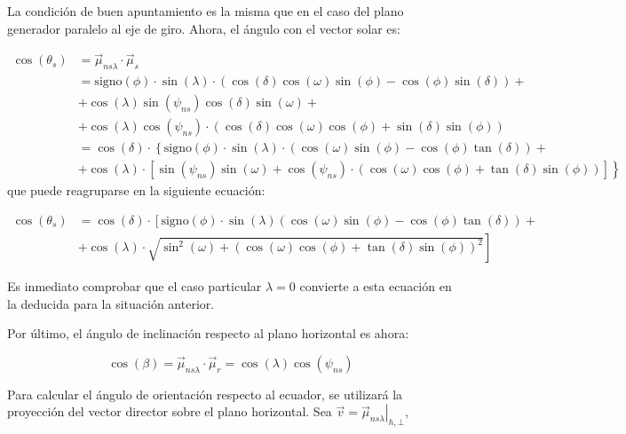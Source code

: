 La condición de buen apuntamiento es la misma que en el caso del plano
generador paralelo al eje de giro. Ahora, el ángulo con el vector
solar es:

\begin{align}
\cos(\theta_{s}) & =\vec{\mu}_{ns\lambda}\cdot\vec{\mu}_{s}\nonumber \\
 & =\mathrm{signo}(\phi)\cdot\sin(\lambda)\cdot\left(\cos(\delta)\cos(\omega)\sin(\phi)-\cos(\phi)\sin(\delta)\right)+\nonumber \\
 & +\cos(\lambda)\sin(\psi_{ns})\cos(\delta)\sin(\omega)+\nonumber \\
 & +\cos(\lambda)\cos(\psi_{ns})\cdot\left(\cos(\delta)\cos(\omega)\cos(\phi)+\sin(\delta)\sin(\phi)\right)\label{eq:cosThetaNSInclinado1}\\
 & =\cos(\delta)\cdot\left\{ \mathrm{signo}(\phi)\cdot\sin(\lambda)\cdot\left(\cos(\omega)\sin(\phi)-\cos(\phi)\tan(\delta)\right)\right.+\nonumber \\
 & +\cos(\lambda)\cdot\left.\left[\sin(\psi_{ns})\sin(\omega)+\cos(\psi_{ns})\cdot\left(\cos(\omega)\cos(\phi)+\tan(\delta)\sin(\phi)\right)\right]\right\} \nonumber \end{align}
que puede reagruparse en la siguiente ecuación:

\begin{align}
\cos(\theta_{s}) & =\cos(\delta)\cdot\left[\mathrm{signo}(\phi)\cdot\sin(\lambda)\left(\cos(\omega)\sin(\phi)-\cos(\phi)\tan(\delta)\right)+\right.\nonumber \\
 & +\left.\cos(\lambda)\cdot\sqrt{\sin^{2}(\omega)+\left(\cos(\omega)\cos(\phi)+\tan(\delta)\sin(\phi)\right)^{2}}\right]\label{eq:cosThetaNSInclinadoFinal}\end{align}


Es inmediato comprobar que el caso particular $\lambda=0$ convierte
a esta ecuación en la deducida para la situación anterior.

Por último, el ángulo de inclinación respecto al plano horizontal
es ahora:

\begin{equation}
\cos(\beta)=\vec{\mu}_{ns\lambda}\cdot\vec{\mu}_{r}=\cos(\lambda)\cos(\psi_{ns})\label{eq:cosBetaNSInclinado}\end{equation}


Para calcular el ángulo de orientación respecto al ecuador, se utilizará
la proyección del vector director sobre el plano horizontal. Sea $\vec{v}=\left.\vec{\mu}_{ns\lambda}\right|_{h,\bot}$,

